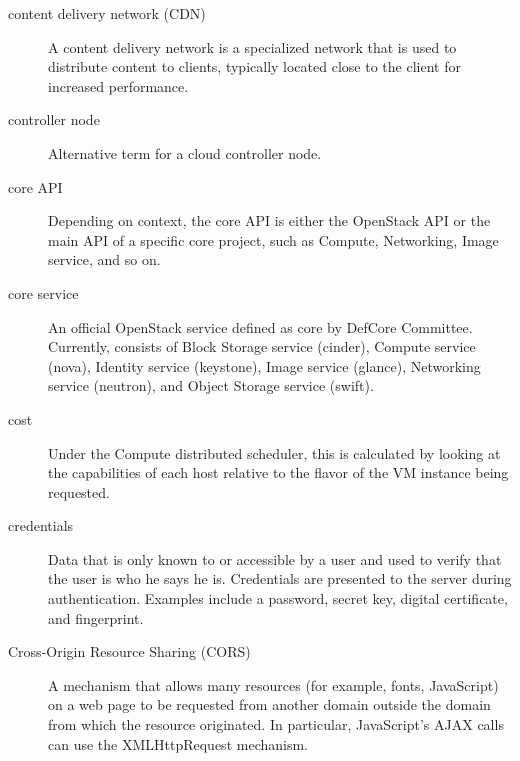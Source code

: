 \documentclass[letterpaper,10pt,english]{sphinxmanual}
\begin{document}
\begin{description}
\item[{content delivery network (CDN)}] \leavevmode{}\label{_source/glossary:term-content-delivery-network-cdn}
A content delivery network is a specialized network that is
used to distribute content to clients, typically located
close to the client for increased performance.

\item[{controller node}] \leavevmode{}\label{_source/glossary:term-controller-node}
Alternative term for a cloud controller node.

\item[{core API}] \leavevmode{}\label{_source/glossary:term-core-api}
Depending on context, the core API is either the OpenStack API
or the main API of a specific core project, such as Compute,
Networking, Image service, and so on.

\item[{core service}] \leavevmode{}\label{_source/glossary:term-core-service}
An official OpenStack service defined as core by
DefCore Committee. Currently, consists of
Block Storage service (cinder), Compute service (nova),
Identity service (keystone), Image service (glance),
Networking service (neutron), and Object Storage service (swift).

\item[{cost}] \leavevmode{}\label{_source/glossary:term-cost}
Under the Compute distributed scheduler, this is calculated by
looking at the capabilities of each host relative to the flavor of the
VM instance being requested.

\item[{credentials}] \leavevmode{}\label{_source/glossary:term-credentials}
Data that is only known to or accessible by a user and
used to verify that the user is who he says he is.
Credentials are presented to the server during
authentication. Examples include a password, secret key,
digital certificate, and fingerprint.

\item[{Cross-Origin Resource Sharing (CORS)}] \leavevmode{}\label{_source/glossary:term-cross-origin-resource-sharing-cors}
A mechanism that allows many resources (for example,
fonts, JavaScript) on a web page to be requested from
another domain outside the domain from which the resource
originated. In particular, JavaScript's AJAX calls can use
the XMLHttpRequest mechanism.


\end{description}
\end{document}
